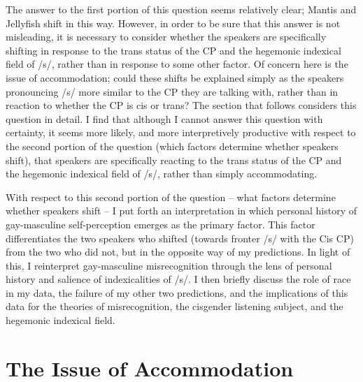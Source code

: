 \documentclass[12pt,twoside]{reedthesis}
\begin{document}
The answer to the first portion of this question seems relatively clear; Mantis and Jellyfish shift in this way. However, in order to be sure that this answer is not misleading, it is necessary to consider whether the speakers are specifically shifting in response to the trans status of the CP and the hegemonic indexical field of /s/, rather than in response to some other factor. Of concern here is the issue of accommodation; could these shifts be explained simply as the speakers pronouncing /s/ more similar to the CP they are talking with, rather than in reaction to whether the CP is cis or trans? The section that follows considers this question in detail. I find that although I cannot answer this question with certainty, it seems more likely, and more interpretively productive with respect to the second portion of the question (which factors determine whether speakers shift), that speakers are specifically reacting to the trans status of the CP and the hegemonic indexical field of /s/, rather than simply accommodating.

With respect to this second portion of the question -- what factors determine whether speakers shift -- I put forth an interpretation in which personal history of gay-masculine self-perception emerges as the primary factor. This factor differentiates the two speakers who shifted (towards fronter /s/ with the Cis CP) from the two who did not, but in the opposite way of my predictions. In light of this, I reinterpret gay-masculine misrecognition through the lens of personal history and salience of indexicalities of /s/. I then briefly discuss the role of race in my data, the failure of my other two predictions, and the implications of this data for the theories of misrecognition, the cisgender listening subject, and the hegemonic indexical field.

\section{The Issue of Accommodation} \label{accomodationsection}
\end{document}
